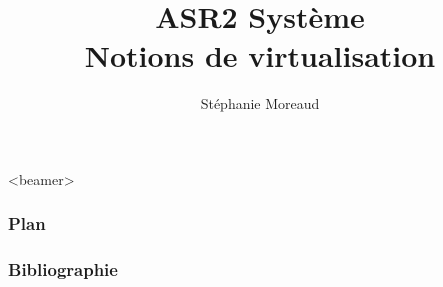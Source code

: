 \def\col{blue}

\usepackage{multicol}

\def\enseignement{ASR2 Système}
\title[]{\enseignement\\
Notions de virtualisation}
\author{Stéphanie Moreaud}
\date{}

   
\newcommand{\TITRE}[1]{
  \begin{frame} \begin{center}\huge{#1}\end{center}
\end{frame}
}
\newcommand{\FIGURE}[2]{
  \begin{frame} \frametitle{\insertsubsection} 
    \begin{figure} \texttt{[image: fichiers-images/\#1]} 
    \end{figure} 
    \begin{center}\large{#2}\end{center}
\end{frame} }


\begin{frame}
  \titlepage
\end{frame}

\begin{frame}<beamer>
  \frametitle{Plan} 
      \tableofcontents[sections={1-5},currentsection, hideothersubsections] 
\end{frame}

\begin{frame}
\frametitle{Bibliographie}

\small
\nocite{*}    
 
\vspace{0.5cm}    
\end{frame}

